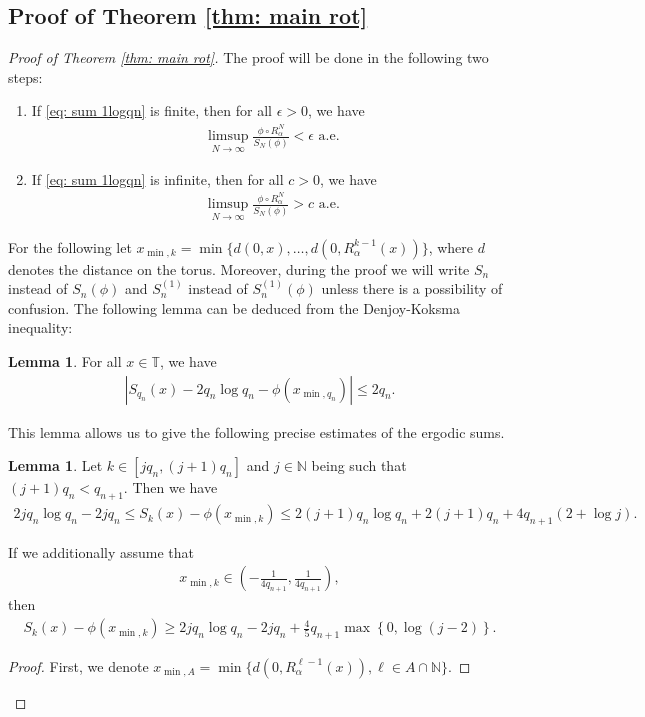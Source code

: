 \documentclass[11pt]{amsart}
\theoremstyle{definition}
\newtheorem{lemma}[definition]{Lemma}
\numberwithin{equation}{section}
\begin{document}
\subsection{Proof of Theorem \ref{thm: main rot}}
\begin{proof}[Proof of Theorem \ref{thm: main rot}]
The proof will be done in the following two steps:
\begin{enumerate}
 \item\label{en: 1} If \eqref{eq: sum 1logqn} is finite, then for all $\epsilon>0$, we have 
\begin{align}\label{eq: limsup 0}
  \limsup_{N\to\infty}\frac{\phi\circ R_{\alpha}^N}{S_N(\phi)}<\epsilon \text{ a.e.}
 \end{align}
  \item\label{en: 2} If \eqref{eq: sum 1logqn} is infinite, then for all $c>0$, we have 
\begin{align}\label{eq: limsup 1}
  \limsup_{N\to\infty}\frac{\phi\circ R_{\alpha}^N}{S_N(\phi)}>c \text{ a.e.}
 \end{align}
\end{enumerate}
For the following let $x_{\min,k}=\min\{d(0,x),\ldots, d(0,R_{\alpha}^{k-1}(x))\}$, where $d$ denotes the distance on the torus.   Moreover, during the proof we will write $S_n$ instead of $S_n(\phi)$ and $S_n^{(1)}$ instead of $S_n^{(1)}(\phi)$ unless there is a possibility of confusion.
The following lemma can be deduced from the Denjoy-Koksma inequality:
\begin{lemma}\label{lem: DK adapted}
 For all $x\in\mathbb{T}$, we have 
 \begin{align*}
  \left|S_{q_n}(x)- 2 q_n\log q_n - \phi(x_{\min,q_n})\right|\leq 2 q_n.
 \end{align*}
\end{lemma}

This lemma allows us to give the following precise estimates of the ergodic sums. 

\begin{lemma}\label{lem: DK adapted 1}
 Let $k\in [j q_n, (j+1) q_n]$ and $j\in\mathbb{N}$ being such that $(j+1) q_n< q_{n+1}$. 
Then we have 
 \begin{align*}
  2j q_n\log q_n-2jq_n\leq S_k(x)-\phi(x_{\min,k})\leq 2(j+1) q_n\log q_n + 2(j+1) q_n + 4q_{n+1}(2+ \log j).
 \end{align*}

 
 If we additionally assume that 
 \begin{align}
 x_{\min, k}\in \left(-\frac{1}{4q_{n+1}}, \frac{1}{4q_{n+1}}\right), \label{eq: xmin close to zero}
 \end{align}
 then 
\begin{align}
S_k(x)-\phi(x_{\min,k})\geq  2j q_n\log q_n - 2jq_n +\frac{4}{5}q_{n+1}\max\left\{0,\log (j-2)\right\}.\label{eq: second lower bound}
\end{align}
\end{lemma}
\begin{proof}
 First, we denote 
 $x_{\min,A}=\min\{d(0,R_{\alpha}^{ \ell-1}(x)),{ \ell}\in A\cap\mathbb{N}\}$.
 

\end{proof}
\end{proof}
\end{document}
